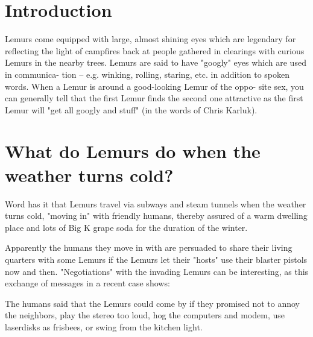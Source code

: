 % 
%
%
%
%
%
%


\chapter{Introduction}

Lemurs come equipped with large, almost shining eyes which
are legendary for reflecting the light of campfires back at people
gathered in clearings with curious Lemurs in the nearby trees.
Lemurs are said to have "googly" eyes which are used in communica-
tion -- e.g. winking, rolling, staring, etc. in addition to spoken
words.  When a Lemur is around a good-looking Lemur of the oppo-
site sex, you can generally tell that the first Lemur finds the
second one attractive as the first Lemur will "get all googly and
stuff" (in the words of Chris Karluk).

\chapter{What do Lemurs do when the weather turns cold?}

Word has it that Lemurs travel via subways and steam tunnels when
the weather turns cold, "moving in" with friendly humans, thereby
assured of a warm dwelling place and lots of Big K grape soda for
the duration of the winter.

Apparently the humans they move in with are persuaded to share
their living quarters with some Lemurs if the Lemurs let their
"hosts"  use their blaster pistols now and then.  "Negotiations"
with the invading Lemurs can be interesting, as this exchange of
messages in a recent case shows:

        The humans said that the Lemurs could come by if they
         promised not to annoy the neighbors, play the stereo too
         loud, hog the computers and modem, use laserdisks as
         frisbees, or swing from the kitchen light.

